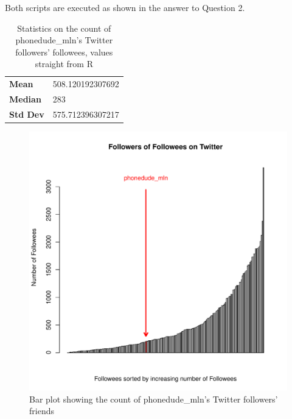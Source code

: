 \documentclass[letterpaper,11pt]{article}
\begin{document}
Both scripts are executed as shown in the answer to Question 2.

\begin{table}
\begin{tabular}{ l l }
\hline
\textbf{Mean} & 508.120192307692 \\
\textbf{Median} & 283 \\
\textbf{Std Dev} &  575.712396307217 \\
\hline
\end{tabular}
\caption{Statistics on the count of phonedude\_mln's Twitter followers' followees, values straight from R}
\label{tab:q4stats}
\end{table}

\clearpage
\begin{figure}[h]
\includegraphics[scale=0.7]{q4/q4-barplot.pdf}
\caption{Bar plot showing the count of phonedude\_mln's Twitter followers' friends}
\label{fig:q4barplot}
\end{figure}


\newpage


\newpage




\clearpage


\end{document}
